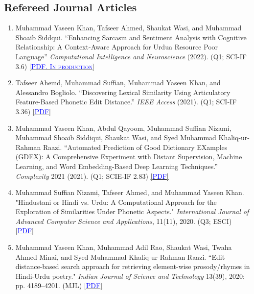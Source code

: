 \documentclass[10pt]{article}
\begin{document}
\subsection*{Refereed Journal Articles}
\begin{enumerate}
\itemsep=0em

\item Muhammad Yaseen Khan, Tafseer Ahmed, Shaukat Wasi, and Muhammad Shoaib Siddqui. ``Enhancing Sarcasm and Sentiment Analysis with Cognitive Relationship: A Context-Aware Approach for Urdu\textemdash a Resource Poor Language'' \emph{Computational Intelligence and Neuroscience} (2022). {\scshape (Q1; \textsc{ \textsc{SCI-IF}} 3.6)} %
\href{https://www.researchgate.net/publication/362634651_Enhancing_Sarcasm_and_Sentiment_Analysis_with_Cognitive_Relationship_A_Context-Aware_Approach_for_Urdu-a_Resource_Poor_Language}{\scshape\small [\textcolor{blue}{PDF. In production}]}


\item Tafseer Ahemd, Muhammad Suffian, Muhammad Yaseen Khan, and Alessandro Bogliolo. ``Discovering Lexical Similarity Using Articulatory Feature-Based Phonetic Edit Distance.'' \emph{IEEE Access} (2021). {\scshape (Q1; \textsc{ \textsc{SCI-IF}} 3.36)} \href{https://doi.org/10.1109/ACCESS.2021.3137905}{\scshape\small [\textcolor{blue}{PDF}]}

\item Muhammad Yaseen Khan, Abdul Qayoom, Muhammad Suffian Nizami, Muhammad Shoaib Siddiqui, Shaukat Wasi, and Syed Muhammad Khaliq-ur-Rahman Raazi. ``Automated Prediction of Good Dictionary EXamples (GDEX): A Comprehensive Experiment with Distant Supervision, Machine Learning, and Word Embedding-Based Deep Learning Techniques.'' \emph{Complexity} 2021 (2021). {\scshape (Q1; \textsc{SCIE-IF} 2.83)} \href{https://doi.org/10.1155/2021/2553199}{\scshape\small [\textcolor{blue}{PDF}]}

\item Muhammad Suffian Nizami, Tafseer Ahmed, and Muhammad Yaseen Khan. "Hindustani or Hindi vs. Urdu: A Computational Approach for the Exploration of Similarities Under Phonetic Aspects."  \emph{International Journal of Advanced Computer Science and Applications}, 11(11), 2020. {\scshape (Q3; \textsc{ESCI})} \href{https://dx.doi.org/10.14569/IJACSA.2020.0111191}{\scshape\small [\textcolor{blue}{PDF}]}

\item Muhammad Yaseen Khan, Muhammad Adil Rao, Shaukat Wasi, Twaha Ahmed Minai, and Syed Muhammad Khaliq-ur-Rahman Raazi. ``Edit distance-based search approach for retrieving element-wise prosody/rhymes in Hindi-Urdu poetry." \emph{Indian Journal of Science and Technology} 13(39), 2020: pp. 4189--4201. {\scshape (\textsc{MJL})} \href{https://doi.org/10.17485/IJST/v13i39.1489}{\scshape\small [\textcolor{blue}{PDF}]}


\end{enumerate}
\end{document}
